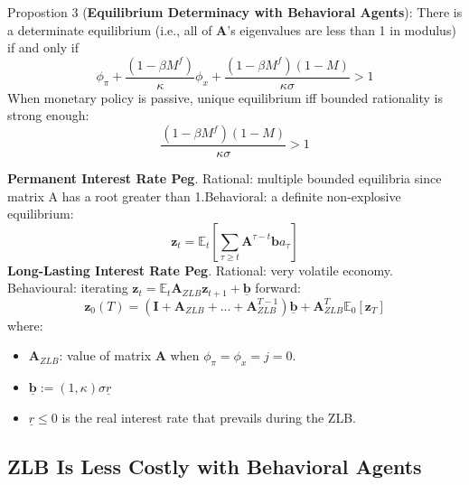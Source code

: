 \documentclass{beamer}
\begin{document}
\begin{frame}{\subsecname}
    Propostion 3 (\textbf{Equilibrium Determinacy with Behavioral Agents}): There is a determinate equilibrium (i.e., all of $\textbf{A}$’s eigenvalues are less than 1 in modulus) if and only if
    \begin{equation}\tag{34}
        \phi_{\pi}+\frac{(1-\beta M^{f})}{\kappa}\phi_{x}+\frac{(1-\beta M^{f})(1-M)}{\kappa\sigma}>1
    \end{equation}
    When monetary policy is passive, unique equilibrium iff bounded rationality is strong enough:
    \begin{equation}\tag{35}
        \frac{(1-\beta M^{f})(1-M)}{\kappa\sigma}>1
    \end{equation}
\end{frame}

\begin{frame}{\subsecname}
    \textbf{Permanent Interest Rate Peg}. Rational: multiple bounded equilibria since matrix A has a root greater than 1.Behavioral: a definite non-explosive equilibrium:
    \begin{equation}
        \textbf{z}_{t}=\mathbb{E}_{t}\left[\sum_{\tau \geq t}\textbf{A}^{\tau-t}\textbf{b}a_{\tau}\right]
    \end{equation}
    \textbf{Long-Lasting Interest Rate Peg}. Rational: very volatile economy. Behavioural: iterating $\textbf{z}_{t}=\mathbb{E}_{t}\textbf{A}_{ZLB}\textbf{z}_{t+1}+\underline{\textbf{b}}$ forward:
    \begin{equation}\tag{36}
        \textbf{z}_{0}(T)=\left(\textbf{I}+\textbf{A}_{ZLB}+...+\textbf{A}_{ZLB}^{T-1}\right)\underline{\textbf{b}}+\textbf{A}_{ZLB}^{T}\mathbb{E}_{0}\left[\textbf{z}_{T}\right]
    \end{equation}
    where:
    \begin{itemize}
        \item $\textbf{A}_{ZLB}$: value of matrix $\textbf{A}$  when $\phi_{\pi}=\phi_{x}=j=0$.
        \item $\underline{\textbf{b}}:=\left(1,\kappa\right)\sigma\underline{r}$
        \item $\underline{r}\leq 0$ is the real interest rate that prevails during the ZLB.
    \end{itemize}
\end{frame}

\subsection{ZLB Is Less Costly with Behavioral Agents}
\end{document}
